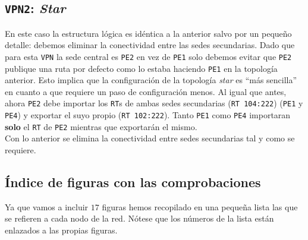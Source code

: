 \documentclass[11pt]{article}
\begin{document}
        \subsection{\texttt{VPN2}: \textit{Star}}
            En este caso la estructura lógica es idéntica a la anterior salvo por un pequeño detalle: debemos eliminar la conectividad entre las sedes secundarias. Dado que para esta \texttt{VPN} la sede central es \texttt{PE2} en vez de \texttt{PE1} solo debemos evitar que \texttt{PE2} publique una ruta por defecto como lo estaba haciendo \texttt{PE1} en la topología anterior. Esto implica que la configuración de la topología \textit{star} es ``más sencilla'' en cuanto a que requiere un paso de configuración menos. Al igual que antes, ahora \texttt{PE2} debe importar los \texttt{RT}s de ambas sedes secundarias (\texttt{RT 104:222}) (\texttt{PE1} y \texttt{PE4}) y exportar el suyo propio (\texttt{RT 102:222}). Tanto \texttt{PE1} como \texttt{PE4} importaran \textbf{solo} el \texttt{RT} de \texttt{PE2} mientras que exportarán el mismo.\\

            Con lo anterior se elimina la conectividad entre sedes secundarias tal y como se requiere.\\

        \subsection{Índice de figuras con las comprobaciones}
            Ya que vamos a incluir $17$ figuras hemos recopilado en una pequeña lista las que se refieren a cada nodo de la red. Nótese que los números de la lista están enlazados a las propias figuras.
\end{document}
